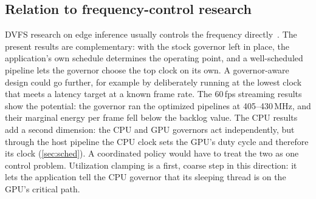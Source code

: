 \subsection{Relation to frequency-control research}

DVFS research on edge inference usually controls the frequency
directly~\cite{kim2021ztt,han2025dvfs,zhang2026sparsedvfs}. The
present results are complementary: with the stock governor left in
place, the application's own schedule determines the operating point,
and a well-scheduled pipeline lets the governor choose the top clock on
its own. A governor-aware design could go further, for example by
deliberately running at the lowest clock that meets a latency target at
a known frame rate. The 60\,fps streaming results show the potential: the governor ran the optimized pipelines at
405--430\,MHz, and their marginal energy per frame fell below the
backlog value. The CPU results add a second dimension: the CPU and GPU
governors act independently, but through the host pipeline the CPU
clock sets the GPU's duty cycle and therefore its clock
(\cref{sec:sched}). A coordinated policy would have to treat the two as
one control problem. Utilization clamping is a first, coarse step in
this direction: it lets the application tell the CPU governor that its
sleeping thread is on the GPU's critical path.
